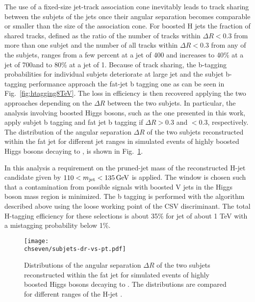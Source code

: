 The use of a fixed-size jet-track association cone inevitably leads to track sharing between the subjets of the jets once their angular separation becomes comparable
or smaller than the size of the association cone. 
For boosted H jets the fraction of shared tracks, defined as the ratio of the number of tracks within $\Delta R < 0.3$
from more than one subjet and the number of all tracks within $\Delta R < 0.3$ from any of the subjets,
ranges from a few percent at a jet \pt of 400\GeV
and increases to 40\% at a jet \pt of 700\GeV and to 80\% at a jet \pt of 1\TeV.
Because of track sharing, the b-tagging probabilities for individual subjets deteriorate at large jet \pt and the subjet b-tagging performance approach the
fat-jet b tagging one as can be seen in Fig.~\ref{fig:htagging8TeV}.
The loss in efficiency is then recovered applying the two approaches depending on the $\Delta R$ between the two subjets.
In particular, the analysis involving boosted Higgs bosons, such as the one presented in this work,
apply subjet b tagging and fat jet b tagging if $\Delta R > 0.3$ and $< 0.3$, respectively. 
The distribution of the angular separation $\Delta R$ of the two subjets reconstructed within the fat jet for different jet \pt ranges 
in simulated events of highly boosted Higgs bosons decaying to \bbbar, is shown in Fig.~\ref{fig:subjetdR}.

In this analysis a requirement on the pruned-jet mass of the reconstructed H-jet candidate given by $110 < m_{\text{jet}} < 135\,\text{Ge\hspace{-.08em}V}$ is applied. The \mJ window is chosen such that a contamination from possible signals with boosted V jets in the Higgs boson mass region is minimized. The b tagging is performed with the algorithm described above using the loose working point of the CSV discriminant. The total H-tagging efficiency for these selections is about 35\% for jet \pt of about 1 TeV with a mistagging probability below 1\%.

\begin{figure}[!htb]
 \begin{center}
  \texttt{[image: \\chseven/subjets-dr-vs-pt.pdf]}
 \end{center}
 \caption{\small Distributions of the angular separation $\Delta R$ of the two subjets reconstructed within the fat jet for simulated events of highly boosted Higgs bosons decaying to \bbbar. The distributions are compared for different ranges of the H-jet \pt.}
 \label{fig:subjetdR}
\end{figure}

